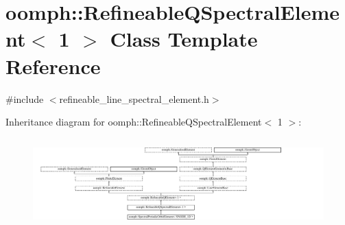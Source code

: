 \hypertarget{classoomph_1_1RefineableQSpectralElement_3_011_01_4}{}\section{oomph\+:\+:Refineable\+Q\+Spectral\+Element$<$ 1 $>$ Class Template Reference}
\label{classoomph_1_1RefineableQSpectralElement_3_011_01_4}


{\ttfamily \#include $<$refineable\+\_\+line\+\_\+spectral\+\_\+element.\+h$>$}

Inheritance diagram for oomph\+:\+:Refineable\+Q\+Spectral\+Element$<$ 1 $>$\+:\begin{figure}[H]
\begin{center}
\leavevmode
\includegraphics[height=3.489097cm]{classoomph_1_1RefineableQSpectralElement_3_011_01_4}
\end{center}
\end{figure}
